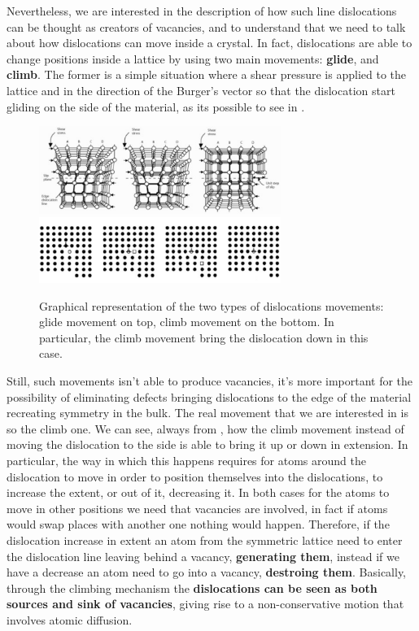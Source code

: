 Nevertheless, we are interested in the description of how such line dislocations can be thought as creators of vacancies, and to understand that we need to talk about how dislocations can move inside a crystal. In fact, dislocations are able to change positions inside a lattice by using two main movements: \textbf{glide}, and \textbf{climb}. The former is a simple situation where a shear pressure is applied to the lattice and in the direction of the Burger's vector so that the dislocation start gliding on the side of the material, as its possible to see in .
\begin{figure}[t]
    \centering
    \includegraphics[width=0.7\textwidth]{Immagini/DisMov1.png}
    \includegraphics[width=0.7\textwidth]{Immagini/DisMov2.png}
    \caption
    {
        Graphical representation of the two types of dislocations movements: glide movement on top, climb movement on the bottom. In particular, the climb movement bring the dislocation down in this case.
    }
    \label{fig:DisMov}
\end{figure}
Still, such movements isn't able to produce vacancies, it's more important for the possibility of eliminating defects bringing dislocations to the edge of the material recreating symmetry in the bulk. The real movement that we are interested in is so the climb one. We can see, always from , how the climb movement instead of moving the dislocation to the side is able to bring it up or down in extension. In particular, the way in which this happens requires for atoms around the dislocation to move in order to position themselves into the dislocations, to increase the extent, or out of it, decreasing it. In both cases for the atoms to move in other positions we need that vacancies are involved, in fact if atoms would swap places with another one nothing would happen. Therefore, if the dislocation increase in extent an atom from the symmetric lattice need to enter the dislocation line leaving behind a vacancy, \textbf{generating them}, instead if we have a decrease an atom need to go into a vacancy, \textbf{destroing them}. Basically, through the climbing mechanism the \textbf{dislocations can be seen as both sources and sink of vacancies}, giving rise to a non-conservative motion that involves atomic diffusion.

